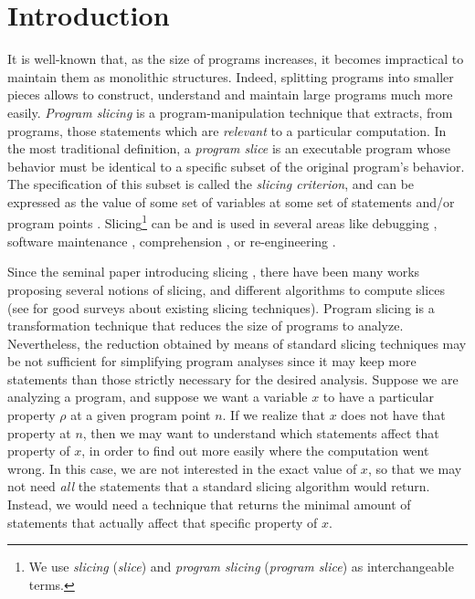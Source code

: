 \documentclass[prodmode,acmtocl]{acmsmall}
\def\uco{\ensuremath{\rho}\xspace}
\newcommand{\0}{\mbox{\bf 0}}
\begin{document}
\maketitle

\section{Introduction}
It is well-known that, as the size of programs increases, it becomes
impractical to maintain them as monolithic structures.  Indeed,
splitting programs into smaller pieces allows to construct, understand
and maintain large programs much more easily.  \emph{Program slicing}
\cite{BinGalla96,DeLucia,Tip95,weiser} is a program-manipulation
technique that extracts, from programs, those statements which are
\emph{relevant} to a particular computation.  In the most traditional
definition, a \emph{program slice} is an executable program whose
behavior must be identical to a specific subset of the original
program's behavior.  The specification of this subset is called the
\emph{slicing criterion}, and can be expressed as the value of some
set of variables at some set of statements and/or program points
\cite{weiser}.  Slicing\footnote{We use \emph{slicing} (\emph{slice})
  and \emph{program slicing} (\emph{program slice}) as interchangeable
  terms.} can be and is used in several areas like debugging
\cite{weiser}, software maintenance \cite{GL91ieee}, comprehension
\cite{Conditioned,FRT96}, or re-engineering \cite{CDM96}.

Since the seminal paper introducing slicing \cite{weiser}, there have
been many works proposing several notions of slicing, and different
algorithms to compute slices (see \cite{DeLucia,Tip95} for good
surveys about existing slicing techniques).  Program slicing is a
transformation technique that reduces the size of programs to analyze.
Nevertheless, the reduction obtained by means of standard slicing
techniques may be not sufficient for simplifying program analyses
since it may keep more statements than those strictly necessary for
the desired analysis.  Suppose we are analyzing a program, and suppose
we want a variable $x$ to have a particular property $\uco$ at a given
program point $n$.  If we realize that $x$ does not have that property
at $n$, then we may want to understand which statements affect that
property of $x$, in order to find out more easily where the
computation went wrong.  In this case, we are not interested in the
exact value of $x$, so that we may not need \emph{all} the statements
that a standard slicing algorithm would return.  Instead, we would
need a technique that returns the minimal amount of statements that
actually affect that specific property of $x$.
\end{document}
